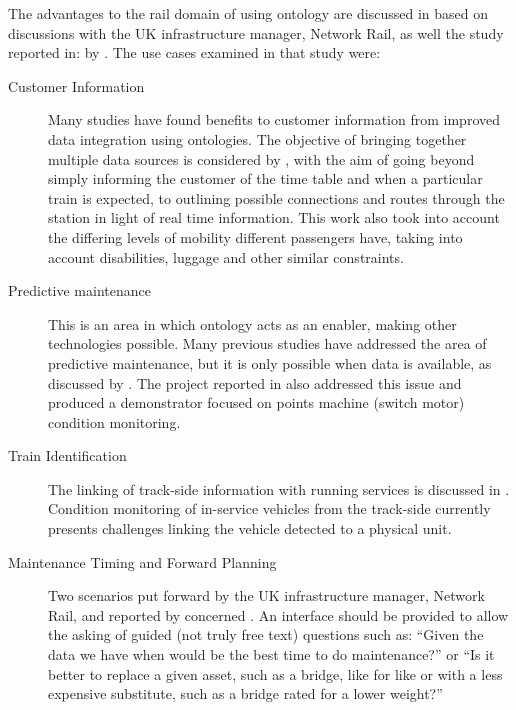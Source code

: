 The advantages to the rail domain of using ontology are discussed in \citet{Morris} based on discussions with the UK infrastructure manager, Network Rail, as well the study reported in:  by \citet{Roberts2011}. The use cases examined in that study were:
\begin{description}
    \item[Customer Information] Many studies have found benefits to customer information from improved data integration using ontologies. The objective of bringing together multiple data sources is considered by \citet{Verstichel2014}, with the aim of going beyond simply informing the customer of the time table and when a particular train is expected, to outlining possible connections and routes through the station in light of real time information. This work also took into account the differing levels of mobility different passengers have, taking into account disabilities, luggage and other similar constraints.
    \item[Predictive maintenance]
    This is an area in which ontology acts as an enabler, making other technologies possible. Many previous studies have addressed the area of predictive maintenance, but it is only possible when data is available, as discussed by \citet{Umiliacchi2011}. The project reported in \citet{Tutcher2015a} also addressed this issue and produced a demonstrator focused on points machine (switch motor) condition monitoring. 
    \item[Train Identification]
    The linking of track-side information with running services is discussed in \citep{Morris}. Condition monitoring of in-service vehicles from the track-side currently presents challenges linking the vehicle detected to a physical unit. 
    \item[Maintenance Timing and Forward Planning]
    Two scenarios put forward by the UK infrastructure manager, Network Rail, and reported by \citet{Morris} concerned . An interface should be provided to allow the asking of guided (not truly free text) questions such as: ``Given the data we have when would be the best time to do maintenance?'' or ``Is it better to replace a given asset, such as a bridge, like for like or with a less expensive substitute, such as a bridge rated for a lower weight?''    
\end{description}
    
